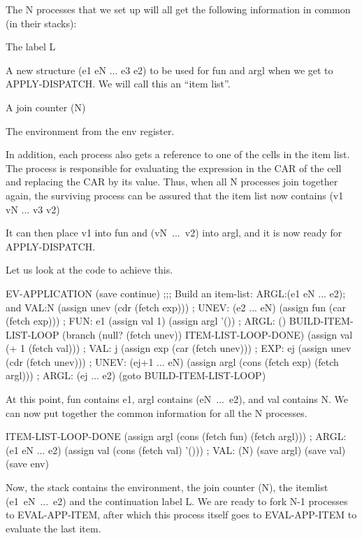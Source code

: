 The N processes that we set up will all get the following information
in common (in their stacks):
 \begin{tightlist}
 \item The label L
 \item A new structure {\cf (e1 eN ... e3 e2)} to be used for {\cf fun} and {\cf argl}
when we get to APPLY-DISPATCH.  We will call this an ``item list''.
 \item A join counter {\cf (N)}
 \item The environment from the {\cf env} register.
 \end{tightlist}

In addition, each process also gets a reference to one of the cells in
the item list.  The process is responsible for evaluating the
expression in the CAR of the cell and replacing the CAR by its value.
Thus, when all N processes {\cf join} together again, the surviving
process can be assured that the item list now contains
 \beginlisp
    (v1 vN ... v3 v2)
 \endlisp

It can then place {\cf v1} into {\cf fun} and \mbox{\cf (vN ... v2)}
into {\cf argl}, and it is now ready for {\cf APPLY-DISPATCH}.

Let us look at the code to achieve this.

\beginlisp
EV-APPLICATION
  (save continue)
\null
;;; Build an item-list: ARGL:(e1 eN ... e2); and VAL:N
  (assign unev (cdr (fetch exp)))    ; UNEV: (e2 ... eN)
  (assign fun (car (fetch exp)))     ; FUN: e1
  (assign val 1)
  (assign argl '())                  ; ARGL: ()
\null
BUILD-ITEM-LIST-LOOP
  (branch (null? (fetch unev)) ITEM-LIST-LOOP-DONE)
  (assign val (+ 1 (fetch val)))                 ; VAL: j
  (assign exp (car (fetch unev)))                ; EXP: ej
  (assign unev (cdr (fetch unev)))               ; UNEV: (ej+1 ... eN)
  (assign argl (cons (fetch exp) (fetch argl)))  ; ARGL: (ej ... e2)
  (goto BUILD-ITEM-LIST-LOOP)
\endlisp

At this point, {\cf fun} contains {\cf e1}, {\cf argl} contains
\mbox{\cf (eN ... e2)}, and {\cf val} contains N.  We can now put
together the common information for all the N processes.

\beginlisp
ITEM-LIST-LOOP-DONE
  (assign argl (cons (fetch fun) (fetch argl))) ; ARGL: (e1 eN ... e2)
  (assign val (cons (fetch val) '()))           ; VAL: (N)
  (save argl)
  (save val)
  (save env)
\endlisp

Now, the {\cf stack} contains the environment, the join counter {\cf
(N)}, the itemlist \mbox{\cf (e1 eN ... e2)} and the continuation
label L.  We are ready to fork N-1 processes to {\cf EVAL-APP-ITEM},
after which this process itself goes to {\cf EVAL-APP-ITEM} to
evaluate the last item.

